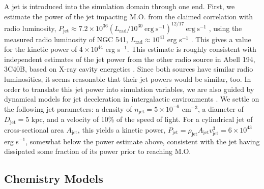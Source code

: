 \documentclass{aastex6}
\begin{document}
A jet is introduced into the simulation domain through one end. First, we estimate the power of the jet impacting M.O. from the claimed correlation with radio luminosity, $P_\mathrm{jet} \approx 7.2 \times 10^{36} (L_\mathrm{rad}/10^{30}~\mathrm{erg~s}^{-1})^{12/17} ~\mathrm{erg~s}^{-1}$ \citep{Kording08}, using the measured radio luminosity of NGC 541, $L_\mathrm{rad} \approx 10^{41}$ erg s$^{-1}$ \citep{vanBreugel85}. This gives a value for the kinetic power of $4 \times 10^{44}$ erg s$^{-1}$. This estimate is roughly consistent with independent estimates of the jet power from the other radio source in Abell 194, 3C40B, based on X-ray cavity energetics \citep{Bogdan11}. Since both sources have similar radio luminosities, it seems reasonable that their jet powers would be similar, too. In order to translate this jet power into simulation variables, we are also guided by dynamical models for jet deceleration in intergalactic environments \citep[e.g.][]{Laing02}. We settle on the following jet parameters: a density of $n_\mathrm{jet} = 5 \times 10^{-6}$ cm$^{-3}$, a diameter of $D_\mathrm{jet} = 5$ kpc, and a velocity of 10\% of the speed of light. For a cylindrical jet of cross-sectional area $A_\mathrm{jet}$, this yields a kinetic power, $P_\mathrm{jet} = \rho_\mathrm{jet} A_\mathrm{jet} v_\mathrm{jet}^3 = 6 \times 10^{43}$ erg s$^{-1}$, somewhat below the power estimate above, consistent with the jet having dissipated some fraction of its power prior to reaching M.O.


\subsection{Chemistry Models}
\end{document}

